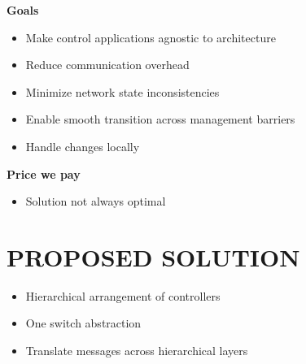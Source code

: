 \documentclass[portrait,a1]{a0poster}
\begin{document}
\begin{multicols}{2}
\textbf{Goals}
\begin{itemize}
    \item Make control applications agnostic to architecture
    \item Reduce communication overhead
    \item Minimize network state inconsistencies
    \item Enable smooth transition across management barriers
    \item Handle changes locally \\
\end{itemize}

\textbf{Price we pay}
\begin{itemize}
    \item Solution not always optimal
\end{itemize}

\color{SaddleBrown}
\section*{PROPOSED SOLUTION}
\color{DarkSlateGray}
\begin{itemize}
    \item Hierarchical arrangement of controllers
    \item One switch abstraction
    \item Translate messages across hierarchical layers
\end{itemize}


\end{multicols}
\end{document}

